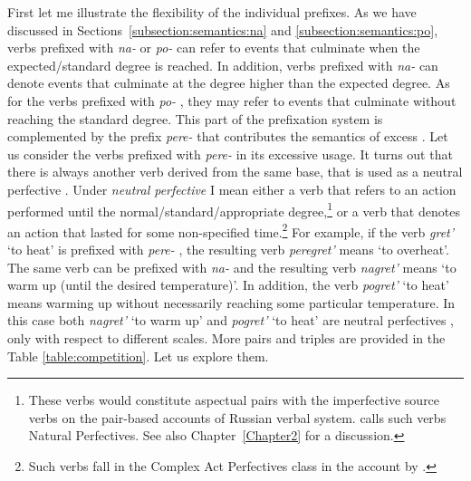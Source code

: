 First let me illustrate the flexibility of the individual prefixes. As we have discussed in Sections~\ref{subsection:semantics:na} and \ref{subsection:semantics:po}, verbs prefixed with \textit{na-}   or \textit{po-}   can refer to events that culminate when the expected/standard degree is reached. In addition, verbs prefixed with \textit{na-}   can denote events that culminate at the degree higher than the expected degree. As for the verbs prefixed with \textit{po-}  , they may refer to events that culminate without reaching the standard degree. This part of the prefixation  system is complemented by the prefix \textit{pere-}   that contributes the semantics of excess . Let us consider the verbs prefixed with \textit{pere-}   in its excessive  usage. It turns out that there is always another verb derived from the same base, that is used as a neutral perfective  . Under \textit{neutral perfective  } I mean either a verb that refers to an action performed until the normal/standard/appropriate degree,\footnote{These verbs would constitute aspectual pairs  with the imperfective source verbs on the pair-based accounts of Russian verbal system. \citet{Janda:07a} calls such verbs Natural Perfectives. See also Chapter~\ref{Chapter2} for a discussion.} or a verb that denotes an action that lasted for some non-specified time.\footnote{Such verbs fall in the Complex Act Perfectives class in the account by \citet{Janda:07a}.} For example, if the verb \textit{gret'} `to heat' is prefixed with \textit{pere-}  , the resulting verb \textit{peregret'} means `to overheat'. The same verb can be prefixed with \textit{na-}   and the resulting verb \textit{nagret'} means `to warm up (until the desired temperature)'. In addition, the verb \textit{pogret'} `to heat' means warming up without necessarily reaching some particular temperature. In this case both \textit{nagret'} `to warm up'  and \textit{pogret'} `to heat' are neutral perfectives  , only with respect to different scales. More pairs and triples are provided in the Table \ref{table:competition}. Let us explore them. 

